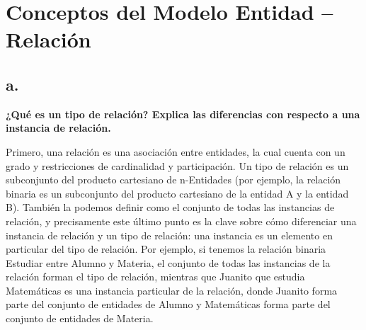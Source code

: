 \section{Conceptos del Modelo Entidad – Relación}
\subsection*{a. }

    
\textbf{¿Qué es un tipo de relación? Explica las diferencias con respecto a una instancia de relación.}

Primero, una relación es una asociación entre entidades, la cual cuenta con un grado y restricciones de cardinalidad y participación. Un tipo de relación es un subconjunto del producto cartesiano de n-Entidades (por ejemplo, la relación binaria es un subconjunto del producto cartesiano de la entidad A y la entidad B). También la podemos definir como el conjunto de todas las instancias de relación, y precisamente este último punto es la clave sobre cómo diferenciar una instancia de relación y un tipo de relación: una instancia es un elemento en particular del tipo de relación. Por ejemplo, si tenemos la relación binaria Estudiar entre Alumno y Materia, el conjunto de todas las instancias de la relación forman el tipo de relación, mientras que Juanito que estudia Matemáticas es una instancia particular de la relación, donde Juanito forma parte del conjunto de entidades de Alumno y Matemáticas forma parte del conjunto de entidades de Materia.
